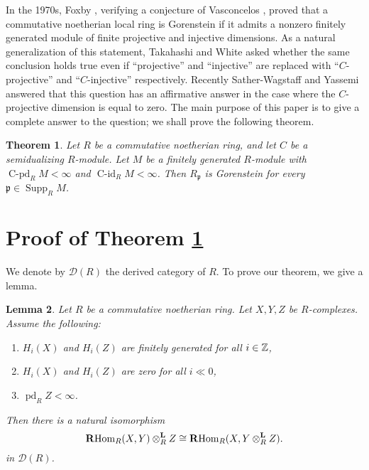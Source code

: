 \documentclass[a4, 10pt]{amsart}
\theoremstyle{plain}
\newtheorem{thm}{Theorem}[section]
\newtheorem{lem}[thm]{Lemma}
\theoremstyle{definition}
\theoremstyle{remark}
\def\RHom{\operatorname{{\bf R}Hom}}
\def\p{\mathfrak p}
\def\Z{\Bbb Z}
\def\Supp{\operatorname{Supp}}
\def\pd{\operatorname{pd}}
\def\cpd{\operatorname{\text{$C$}-pd}}
\def\cid{\operatorname{\text{$C$}-id}}
\def\D{{\mathcal D}}
\begin{document}
In the 1970s, Foxby \cite{F}, verifying a conjecture of Vasconcelos \cite{V}, proved that a commutative noetherian local ring is Gorenstein if it admits a nonzero finitely generated module of finite projective and injective dimensions.
As a natural generalization of this statement, Takahashi and White \cite{cdim} asked whether the same conclusion holds true even if ``projective'' and ``injective'' are replaced with ``$C$-projective'' and ``$C$-injective'' respectively.
Recently Sather-Wagstaff and Yassemi \cite{SY} answered that this question has an affirmative answer in the case where the $C$-projective dimension is equal to zero.
The main purpose of this paper is to give a complete answer to the question; we shall prove the following theorem.

\begin{thm}\label{main}
Let $R$ be a commutative noetherian ring, and let $C$ be a semidualizing $R$-module.
Let $M$ be a finitely generated $R$-module with $\cpd_RM<\infty$ and $\cid_RM<\infty$.
Then $R_\p$ is Gorenstein for every $\p\in\Supp_RM$.
\end{thm}

\section{Proof of Theorem \ref{main}}

We denote by $\D(R)$ the derived category of $R$.
To prove our theorem, we give a lemma.

\begin{lem}\label{lem}
Let $R$ be a commutative noetherian ring.
Let $X,Y,Z$ be $R$-complexes.
Assume the following:
\begin{enumerate}[\rm (1)]
\item
$H_i(X)$ and $H_i(Z)$ are finitely generated for all $i\in\Z$, 
\item
$H_i(X)$ and $H_i(Z)$ are zero for all $i\ll 0$,
\item
$\pd_RZ<\infty$.
\end{enumerate}
Then there is a natural isomorphism
$$
\RHom_R(X,Y)\otimes_R^{\bf L}Z\cong\RHom_R(X,Y\otimes_R^{\bf L}Z).
$$
in $\D(R)$.
\end{lem}
\end{document}
